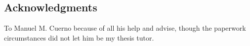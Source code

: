 \subsection*{Acknowledgments}
To Manuel M. Cuerno because of all his help and advise, though the paperwork circumstances did not let him be my thesis tutor.
